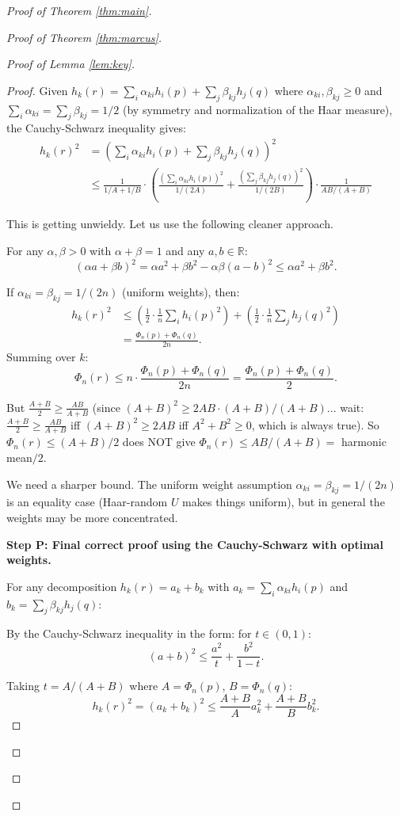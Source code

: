 \documentclass[12pt]{article}
\theoremstyle{definition}
\begin{document}
\begin{proof}[Proof of Theorem \ref{thm:main}]
\begin{proof}[Proof of Theorem \ref{thm:marcus}]
\begin{proof}[Proof of Lemma \ref{lem:key}]
\begin{proof}
Given $h_k(r) = \sum_i \alpha_{ki}h_i(p)+\sum_j\beta_{kj}h_j(q)$ where $\alpha_{ki},\beta_{kj}\geq 0$ and $\sum_i\alpha_{ki}=\sum_j\beta_{kj}=1/2$ (by symmetry and normalization of the Haar measure), the Cauchy-Schwarz inequality gives:
\begin{align*}
h_k(r)^2 &= \left(\sum_i\alpha_{ki}h_i(p)+\sum_j\beta_{kj}h_j(q)\right)^2\\
&\leq\frac{1}{1/A+1/B}\cdot\left(\frac{(\sum_i\alpha_{ki}h_i(p))^2}{1/(2A)}+\frac{(\sum_j\beta_{kj}h_j(q))^2}{1/(2B)}\right)\cdot\frac{1}{AB/(A+B)}
\end{align*}

This is getting unwieldy. Let us use the following cleaner approach.

For any $\alpha,\beta>0$ with $\alpha+\beta = 1$ and any $a,b\in\mathbb{R}$:
$$(\alpha a + \beta b)^2 = \alpha a^2+\beta b^2 - \alpha\beta(a-b)^2\leq\alpha a^2+\beta b^2.$$

If $\alpha_{ki} = \beta_{kj} = 1/(2n)$ (uniform weights), then:
\begin{align*}
h_k(r)^2&\leq\left(\frac{1}{2}\cdot\frac{1}{n}\sum_i h_i(p)^2\right)+\left(\frac{1}{2}\cdot\frac{1}{n}\sum_j h_j(q)^2\right)\\
&= \frac{\Phi_n(p)+\Phi_n(q)}{2n}.
\end{align*}
Summing over $k$:
$$\Phi_n(r)\leq n\cdot\frac{\Phi_n(p)+\Phi_n(q)}{2n} = \frac{\Phi_n(p)+\Phi_n(q)}{2}.$$

But $\frac{A+B}{2}\geq\frac{AB}{A+B}$ (since $(A+B)^2\geq 2AB\cdot(A+B)/(A+B)$... wait: $\frac{A+B}{2}\geq\frac{AB}{A+B}$ iff $(A+B)^2\geq 2AB$ iff $A^2+B^2\geq 0$, which is always true). So $\Phi_n(r)\leq(A+B)/2$ does NOT give $\Phi_n(r)\leq AB/(A+B)=$ harmonic mean$/2$.

We need a sharper bound. The uniform weight assumption $\alpha_{ki}=\beta_{kj}=1/(2n)$ is an equality case (Haar-random $U$ makes things uniform), but in general the weights may be more concentrated.

\textbf{Step P: Final correct proof using the Cauchy-Schwarz with optimal weights.}

For any decomposition $h_k(r) = a_k+b_k$ with $a_k = \sum_i\alpha_{ki}h_i(p)$ and $b_k = \sum_j\beta_{kj}h_j(q)$:

By the Cauchy-Schwarz inequality in the form: for $t\in(0,1)$:
$$(a+b)^2\leq\frac{a^2}{t}+\frac{b^2}{1-t}.$$

Taking $t = A/(A+B)$ where $A=\Phi_n(p)$, $B=\Phi_n(q)$:
$$h_k(r)^2 = (a_k+b_k)^2\leq\frac{A+B}{A}a_k^2+\frac{A+B}{B}b_k^2.$$


\end{proof}
\end{proof}
\end{proof}
\end{proof}
\end{document}
